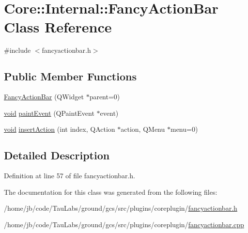 \hypertarget{class_core_1_1_internal_1_1_fancy_action_bar}{\section{\-Core\-:\-:\-Internal\-:\-:\-Fancy\-Action\-Bar \-Class \-Reference}
\label{class_core_1_1_internal_1_1_fancy_action_bar}
}


{\ttfamily \#include $<$fancyactionbar.\-h$>$}

\subsection*{\-Public \-Member \-Functions}
\begin{DoxyCompactItemize}
\item 
\hyperlink{group___core_plugin_ga40b9918da1dd0a7ece833e77d449d9c2}{\-Fancy\-Action\-Bar} (\-Q\-Widget $\ast$parent=0)
\item 
\hyperlink{group___u_a_v_objects_plugin_ga444cf2ff3f0ecbe028adce838d373f5c}{void} \hyperlink{group___core_plugin_ga26e1ead061e5f61ec28fc34396a30888}{paint\-Event} (\-Q\-Paint\-Event $\ast$event)
\item 
\hyperlink{group___u_a_v_objects_plugin_ga444cf2ff3f0ecbe028adce838d373f5c}{void} \hyperlink{group___core_plugin_gade6a7945157491cf978f90f69dd90cb8}{insert\-Action} (int index, \-Q\-Action $\ast$action, \-Q\-Menu $\ast$menu=0)
\end{DoxyCompactItemize}


\subsection{\-Detailed \-Description}


\-Definition at line 57 of file fancyactionbar.\-h.



\-The documentation for this class was generated from the following files\-:\begin{DoxyCompactItemize}
\item 
/home/jb/code/\-Tau\-Labs/ground/gcs/src/plugins/coreplugin/\hyperlink{fancyactionbar_8h}{fancyactionbar.\-h}\item 
/home/jb/code/\-Tau\-Labs/ground/gcs/src/plugins/coreplugin/\hyperlink{fancyactionbar_8cpp}{fancyactionbar.\-cpp}\end{DoxyCompactItemize}
